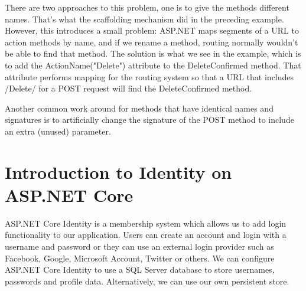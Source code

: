 \documentclass{report}
\begin{document}
    There are two approaches to this problem, one is to give the methods different
    names. That's what the scaffolding mechanism did in the preceding example.
    However, this introduces a small problem: ASP.NET maps segments of a URL to
    action methods by name, and if we rename a method, routing normally wouldn't
    be able to find that method. The solution is what we see in the example, which
    is to add the ActionName("Delete") attribute to the DeleteConfirmed method. That
    attribute performs mapping for the routing system so that a URL that includes /Delete/
    for a POST request will find the DeleteConfirmed method.

    Another common work around for methods that have identical names and signatures is
    to artificially change the signature of the POST method to include an extra (unused)
    parameter.

    \chapter{Introduction to Identity on ASP.NET Core}
    ASP.NET Core Identity is a membership system which allows us to add login functionality
    to our application. Users can create an account and login with a username and password
    or they can use an external login provider such as Facebook, Google, Microsoft Account,
    Twitter or others.
    We can configure ASP.NET Core Identity to use a SQL Server database to store usernames,
    passwords and profile data. Alternatively, we can use our own persistent store.
\end{document}
